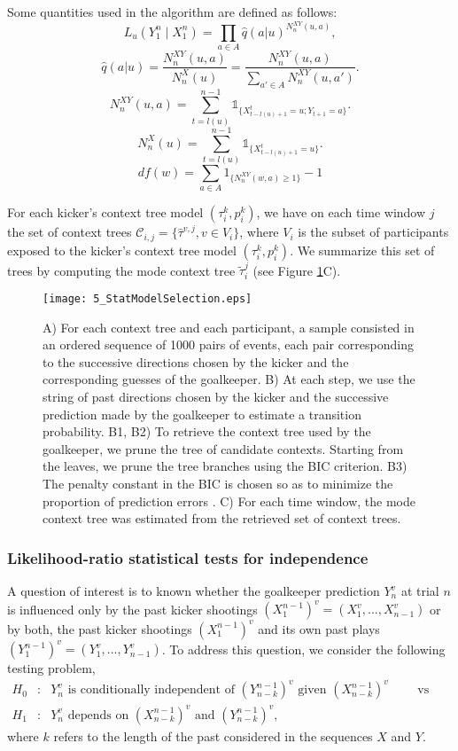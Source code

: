 \documentclass[fleqn,10pt]{wlscirep}
\begin{document}
\vspace{1cm}

Some quantities used in the algorithm are defined as follows:
\[
L_{u}(Y_1^n\mid X^n_1) =\prod_{a \in A} \hat q(a|u)^{N_n^{XY}(u,a)},  
\]
\[
\hat{q}(a|u) = \frac{N_n^{XY}(u,a)}{N_n^X(u)} = \frac{N_n^{XY}(u,a)}{\sum_{a'\in A} N_n^{XY}(u, a')} .
\]
\[
N_n^{XY}(u,a) = \sum_{t = l(u)}^{n-1}\mathds{1}_{ \{ X_{t-l(u)+1}^t = u; Y_{t+1} = a \} }.
\]
\[
N_n^X(u) = \sum_{t = l(u)}^{n-1}\mathds{1}_{\{X_{t - l(u)+1}^t = u\}}.
\]
\[
df(w)= \sum_{a\in A} 1_{\{N_n^{XY}(w,a)\geq 1\}} - 1
\]

For each kicker's context tree model $(\tau_i^k, p_i^k)$, we have on each time window $j$ the set of context trees $ \mathcal{C}_{i,j} = \{\hat{\tau}^{v,j}, v \in V_i\}$, where $V_i$ is the subset of participants exposed to the kicker's context tree model $(\tau_i^k, p_i^k)$. We summarize this set of trees by computing the mode context tree $\tilde{\tau}_i^j$ (see Figure \ref{fig:modelselection}C). 

\begin{figure}[p]
	\centering
	\texttt{[image: 5\_StatModelSelection.eps]}
	\caption{A) For each context tree and each participant, a sample consisted in an ordered sequence of 1000 pairs of events, each pair corresponding to the successive directions chosen by the kicker and the corresponding guesses of the goalkeeper. B) At each step, we use the string of past directions chosen by the kicker and the successive prediction made by the goalkeeper to estimate a transition probability. B1, B2) To retrieve the context tree used by the goalkeeper, we prune the tree of candidate contexts. Starting from the leaves, we prune the tree branches using the BIC criterion. B3) The penalty constant in the BIC is chosen so as to minimize the proportion of prediction errors \cite{Buhlmann-Wyner:99}. C) For each time window, the mode context tree was estimated from the retrieved set of context trees.}
	\label{fig:modelselection}
\end{figure}
\FloatBarrier

\subsubsection*{Likelihood-ratio statistical tests for independence}  


A question of interest is to known whether the goalkeeper prediction $Y_n^v$ at trial $n$ is influenced only by the past kicker shootings $(X_1^{n-1})^v = (X_1^v,..., X_{n-1}^v)$ or by both, the past kicker shootings $(X_1^{n-1})^v$ and its own past plays $(Y_1^{n-1})^v = (Y_1^v,..., Y_{n-1}^v)$. To address this question, we consider the following testing problem,   
\begin{eqnarray*}
	H_0 &:& Y_n^v \mbox{ is conditionally independent of } (Y_{n-k}^{n-1})^v \mbox{ given } (X_{n-k}^{n-1})^v \qquad \mbox{ vs } \qquad \\
	H_1 &:& Y_n^v \mbox{ depends on } (X_{n-k}^{n-1})^v \mbox{ and } (Y_{n-k}^{n-1})^v,
\end{eqnarray*}
where $k$ refers to the length of the past considered in the sequences $X$ and $Y$.
\end{document}
